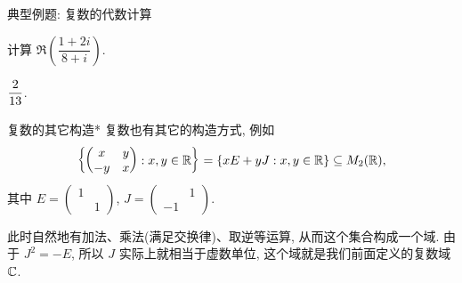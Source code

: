 \begin{frame}{典型例题: 复数的代数计算}
\begin{exercise}
计算 $\Re\left(\dfrac{1+2i}{8+i}\right)$.
\end{exercise}
\begin{answer}
$\dfrac2{13}\vphantom{\Re\left(\dfrac{1+2i}{8+i}\right)}$.
\end{answer}
\end{frame}


\begin{frame}{复数的其它构造*}
\onslide<+->
复数也有其它的构造方式, 
\onslide<+->
例如
\[{\left\{\begin{pmatrix}
x&y\\-y&x\end{pmatrix}: x,y\in{\mathbb{R}}\right\}}
={\left\{xE+yJ: x,y\in{\mathbb{R}}\right\}}\subseteq M_2({\mathbb{R}}),\]
\onslide<+->
其中 $E=\begin{pmatrix}1& \\&1\end{pmatrix}$,
$J=\begin{pmatrix}&1\\-1&\end{pmatrix}$.

\onslide<+->
此时自然地有加法、乘法(满足交换律)、取逆等运算, 从而这个集合构成一个域.
\onslide<+->
由于 $J^2=-E$, 所以 $J$ 实际上就相当于虚数单位, 这个域就是我们前面定义的复数域 ${\mathbb{C}}$.
\end{frame}



